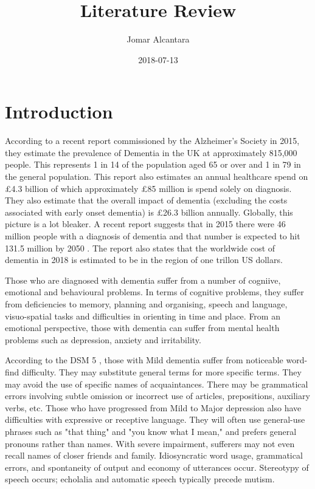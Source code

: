 \documentclass[a4paper]{article}
\title{Literature Review}
\date{2018-07-13}
\author{Jomar Alcantara}
\begin{document}
\maketitle
\newpage
\tableofcontents
\newpage
\section{Introduction}
\par
According to a recent report commissioned by the Alzheimer's Society in 2015, they estimate the prevalence of Dementia in the UK at approximately 815,000 people. This represents 1 in 14 of the population aged 65 or over and 1 in 79 in the general population. This report also estimates an annual healthcare spend on £4.3 billion of which approximately £85 million is spend solely on diagnosis. They also estimate that the overall impact of dementia (excluding the costs associated with early onset dementia) is £26.3 billion annually. Globally, this picture is a lot bleaker. A recent report suggests that in 2015 there were 46 million people with a diagnosis of dementia and that number is expected to hit 131.5 million by 2050 \cite{Prince2015}. The report also states that the worldwide cost of dementia in 2018 is estimated to be in the region of one trillon US dollars. \newline
\par
Those who are diagnosed with dementia suffer from a number of cogniive, emotional and behavioural problems. In terms of cognitive problems, they suffer from deficiencies to memory, planning and organising, speech and language, visuo-spatial tasks and difficulties in orienting in time and place. From an emotional perspective, those with dementia can suffer from mental health problems such as depression, anxiety and irritability.  \newline
\par
According to the DSM 5 \cite{AmericanPsychiatricAssociation2013}, those with Mild dementia suffer from noticeable word-find difficulty. They may substitute general terms for more specific terms. They may avoid the use of specific names of acquaintances. There may be grammatical errors involving subtle omission or incorrect use of articles, prepositions, auxiliary verbs, etc. Those who have progressed from Mild to Major depression also have difficulties with expressive or receptive language. They will often use general-use phrases such as "that thing" and "you know what I mean," and prefers general pronouns rather than names. With severe impairment, sufferers may not even recall names of closer friends and family. Idiosyncratic word usage, grammatical errors, and spontaneity of output and economy of utterances occur. Stereotypy of speech occurs; echolalia and automatic speech typically precede mutism.\newline
\end{document}
